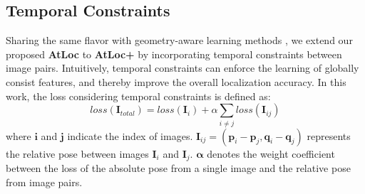\documentclass[letterpaper]{article}
\begin{document}
\subsection{Temporal Constraints}
Sharing the same flavor with geometry-aware learning methods \cite{brahmbhatt2018geometry,xue2019local,huang2019prior}, we extend our proposed \textbf{AtLoc} to \textbf{AtLoc+} by incorporating temporal constraints between image pairs. Intuitively, temporal constraints can enforce the learning of globally consist features, and thereby improve the overall localization accuracy. In this work, the loss considering temporal constraints is defined as:
\begin{equation}
	loss(\mathbf{I}_{total}) =loss(\mathbf{I}_i) + \alpha \sum_{i\neq j} loss(\mathbf{I}_{ij})
	\label{eq:loss_seq}
\end{equation}
where $\mathbf{i}$ and $\mathbf{j}$ indicate the index of images. $\mathbf{I}_{ij} = (\mathbf{p}_i\!-\!\mathbf{p}_j, \mathbf{q}_i\!-\!\mathbf{q}_j)$ represents the relative pose between images $\mathbf{I}_i$ and $\mathbf{I}_j$. $\mathbf{\alpha}$ denotes the weight coefficient between the loss of the absolute pose from a single image and the relative pose from image pairs.

\begin{table}[t]
    \centering
\caption{\textbf{Camera localization results on 7 Scenes (With temporal Constraints).} For each scene, we compare the median errors in both position and rotation of VidLoc, MapNet and our approach.}
	\label{tbl:7scenes_Seq}
	        \vspace{-0.5cm}
\end{table}
\end{document}
